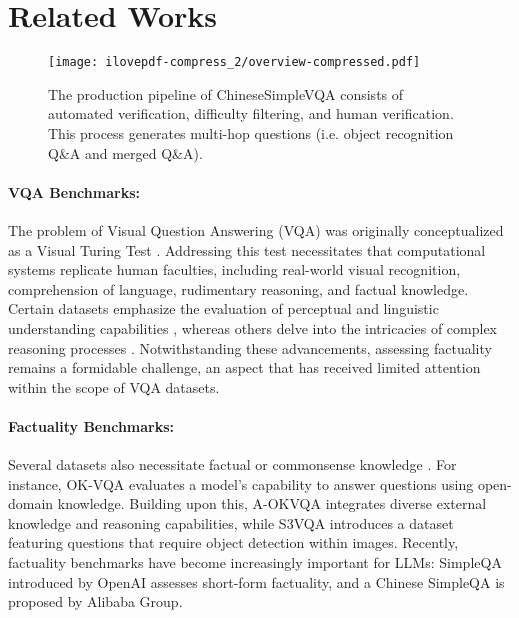 \section{Related Works}
\begin{figure*}[t]
\begin{center}
\texttt{[image: ilovepdf-compress\_2/overview-compressed.pdf]}
\caption{The production pipeline of ChineseSimpleVQA consists of automated verification, difficulty filtering, and human verification. This process generates multi-hop questions (i.e. object recognition Q\&A and merged Q\&A).}
\label{fig.method}
\end{center}
\vspace{-0.6cm}
\end{figure*}

\paragraph{VQA Benchmarks:}
The problem of Visual Question Answering (VQA) was originally conceptualized as a Visual Turing Test \cite{geman2015visual}. Addressing this test necessitates that computational systems replicate human faculties, including real-world visual recognition, comprehension of language, rudimentary reasoning, and factual knowledge. Certain datasets emphasize the evaluation of perceptual and linguistic understanding capabilities \cite{antol2015vqa,malinowski2014multi,goyal2017making,liu2024visual,liu2025mmbench,yu2023mm,li2024seed}, whereas others delve into the intricacies of complex reasoning processes \cite{johnson2017clevr,yue2024mmmu}. Notwithstanding these advancements, assessing factuality remains a formidable challenge, an aspect that has received limited attention within the scope of VQA datasets.

\paragraph{Factuality Benchmarks:}
Several datasets also necessitate factual or commonsense knowledge \cite{marino2019ok, wang2015explicit, wang2017fvqa, zellers2019recognition}. For instance, OK-VQA \cite{marino2019ok} evaluates a model's capability to answer questions using open-domain knowledge. Building upon this, A-OKVQA \cite{schwenk2022okvqa} integrates diverse external knowledge and reasoning capabilities, while S3VQA \cite{jain2021select} introduces a dataset featuring questions that require object detection within images. Recently, factuality benchmarks have become increasingly important for LLMs: SimpleQA introduced by OpenAI \cite{Wei2024MeasuringSF} assesses short-form factuality, and a Chinese SimpleQA \cite{he2024chinese} is proposed by Alibaba Group. 

